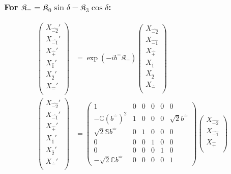 \documentclass[]{article}
\numberwithin{equation}{section}
\begin{document}
{{\subsubsection{For $\mathfrak{K}_{\hat{-}}=\mathfrak{K}_0\sin{\delta}-\mathfrak{K}_3\cos{\delta}$:}
\begin{align}
\begin{pmatrix}
    {X}_{\hat{-2}}'\\
    {X}_{\hat{-1}}'\\
    {X}_{\hat{+}}'\\
    {X}_{\hat{1}}'\\
    {X}_{\hat{2}}'\\
    {X}_{\hat{-}}'\\
    \end{pmatrix}&= \exp{(-ib^{\hat{-}}\mathfrak{K}_{\hat{-}})}\begin{pmatrix}
    {X}_{\hat{-2}}\\
    {X}_{\hat{-1}}\\
    {X}_{\hat{+}}\\
    {X}_{\hat{1}}\\
    {X}_{\hat{2}}\\
    {X}_{\hat{-}}\\
    \end{pmatrix}\\
    \begin{pmatrix}
    {X}_{\hat{-2}}'\\
    {X}_{\hat{-1}}'\\
    {X}_{\hat{+}}'\\
    {X}_{\hat{1}}'\\
    {X}_{\hat{2}}'\\
    {X}_{\hat{-}}'\\
    \end{pmatrix}&= \begin{pmatrix}
        1&0&0&0&0&0\\
        -\mathbb{C}(b^{\hat{-}})^2&1&0&0&0&\sqrt{2}b^{\hat{-}}\\
        \sqrt{2}\mathbb{S}b^{\hat{-}}&0&1&0&0&0\\
        0&0&0&1&0&0\\
        0&0&0&0&1&0\\
        -\sqrt{2}\mathbb{C}b^{\hat{-}}&0&0&0&0&1
    \end{pmatrix}\begin{pmatrix}
    {X}_{\hat{-2}}\\
    {X}_{\hat{-1}}\\
    {X}_{\hat{+}}\\

\end{pmatrix}
\end{align}}}
\end{document}
